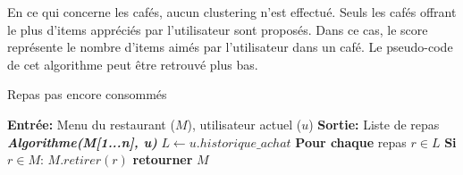 \documentclass[11pt]{article}
\begin{document}
En ce qui concerne les cafés, aucun clustering n'est effectué. Seuls les cafés offrant le plus d'items appréciés par l'utilisateur sont proposés. Dans ce cas, le score représente le nombre d'items aimés par l'utilisateur dans un café. Le pseudo-code de cet algorithme peut être retrouvé plus bas.

\begin{algorithm}[H]
    \caption{Repas pas encore consommés}
    \begin{algorithmic}[1]
    \Statex \textbf{Entrée:} Menu du restaurant ($M$), utilisateur actuel ($u$)
    \Statex \textbf{Sortie:} Liste de repas
    \State \textbf{\textit{Algorithme(M[1...n], u)}}
    \State \hspace{0.5cm} $L \leftarrow u.historique\_achat$
    \State \hspace{0.5cm} \textbf{Pour chaque} repas $r \in L$
    \State \hspace{1cm} \textbf{Si} $r \in M$:
    \State \hspace{1.5cm} $M.retirer(r)$
    \State \hspace{0.5cm} \textbf{retourner} $M$
    \end{algorithmic}
\end{algorithm}
\end{document}
